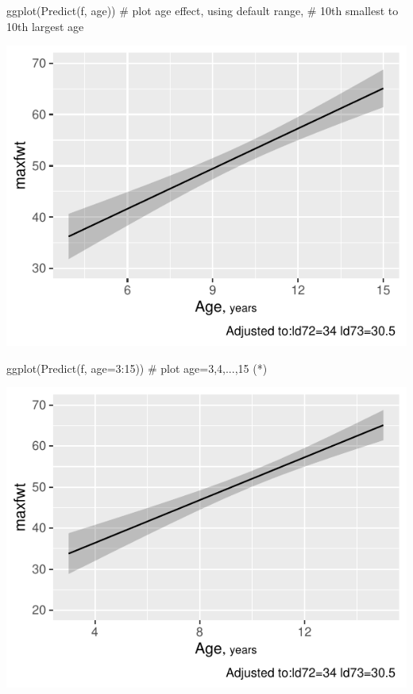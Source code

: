 \begin{Schunk}
\begin{Sinput}
ggplot(Predict(f, age))   # plot age effect, using default range,
                          # 10th smallest to 10th largest age
\end{Sinput}


\centerline{\includegraphics[width=\maxwidth]{rmsintro-unnamed-chunk-9-1} }

\end{Schunk}
\begin{Schunk}
\begin{Sinput}
ggplot(Predict(f, age=3:15))  # plot age=3,4,...,15 (*\ipacue*)
\end{Sinput}


\centerline{\includegraphics[width=\maxwidth]{rmsintro-unnamed-chunk-10-1} }

\end{Schunk}
